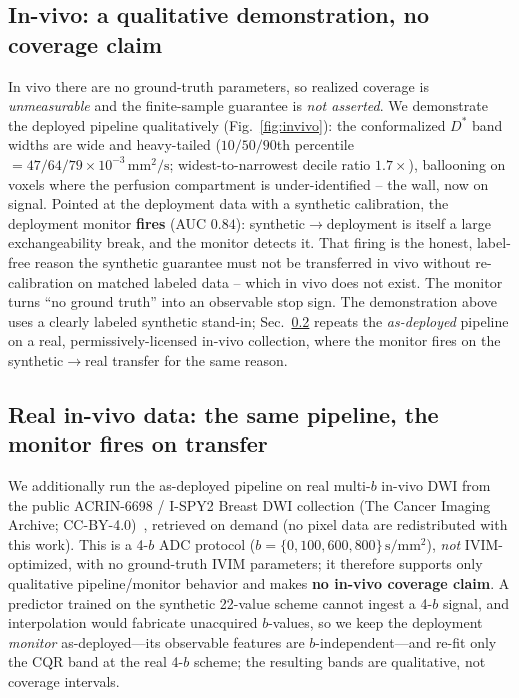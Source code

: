 \documentclass[11pt]{article}
\newcommand{\Dstar}{D^{*}}
\newcommand{\unit}[1]{\,\mathrm{#1}}
\begin{document}
\subsection{In-vivo: a qualitative demonstration, no coverage claim}
\label{sec:invivo}
In vivo there are no ground-truth parameters, so realized coverage is
\emph{unmeasurable} and the finite-sample guarantee is \emph{not asserted}. We
demonstrate the deployed pipeline qualitatively (Fig.~\ref{fig:invivo}): the
conformalized $\Dstar$ band widths are wide and heavy-tailed ($10/50/90$th
percentile $=47/64/79\times10^{-3}\unit{mm^2/s}$; widest-to-narrowest decile ratio
$1.7\times$), ballooning on voxels where the perfusion compartment is
under-identified -- the wall, now on signal. Pointed at the deployment data with a
synthetic calibration, the deployment monitor \textbf{fires} (AUC $0.84$):
synthetic$\to$deployment is itself a large exchangeability break, and the monitor
detects it. That firing is the honest, label-free reason the synthetic guarantee
must not be transferred in vivo without re-calibration on matched labeled data --
which in vivo does not exist. The monitor turns ``no ground truth'' into an
observable stop sign. The demonstration above uses a clearly labeled synthetic
stand-in; Sec.~\ref{sec:invivo-real} repeats the \emph{as-deployed} pipeline on a
real, permissively-licensed in-vivo collection, where the monitor fires on the
synthetic$\to$real transfer for the same reason.



\subsection{Real in-vivo data: the same pipeline, the monitor fires on transfer}
\label{sec:invivo-real}
We additionally run the as-deployed pipeline on real multi-$b$ in-vivo DWI from the
public ACRIN-6698 / I-SPY2 Breast DWI collection (The Cancer Imaging Archive;
CC-BY-4.0)~\cite{acrin6698,clark2013tcia}, retrieved on demand (no pixel data are
redistributed with this work). This is a 4-$b$ ADC protocol
($b=\{0,100,600,800\}\unit{s/mm^2}$), \emph{not} IVIM-optimized, with no
ground-truth IVIM parameters; it therefore supports only qualitative
pipeline/monitor behavior and makes \textbf{no in-vivo coverage claim}. A predictor
trained on the synthetic 22-value scheme cannot ingest a 4-$b$ signal, and
interpolation would fabricate unacquired $b$-values, so we keep the deployment
\emph{monitor} as-deployed---its observable features are $b$-independent---and
re-fit only the CQR band at the real 4-$b$ scheme; the resulting bands are
qualitative, not coverage intervals.
\end{document}
